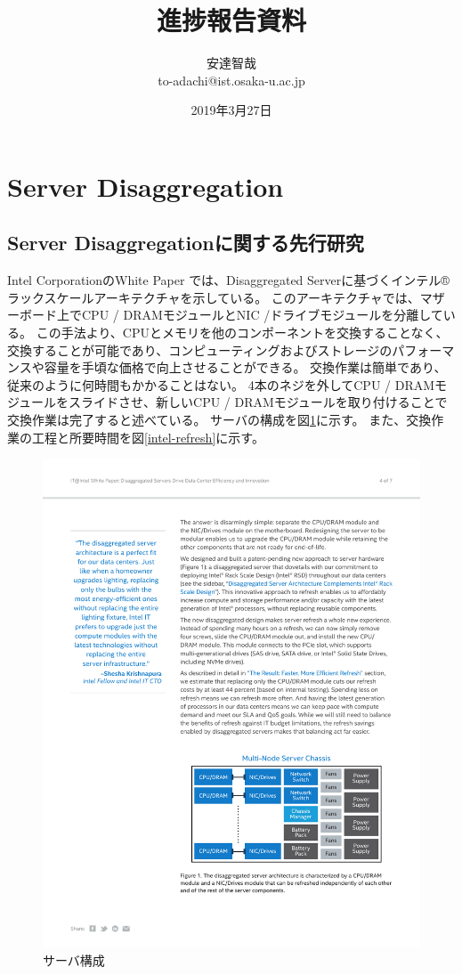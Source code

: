 \documentclass[a4j]{ujarticle}
\title{進捗報告資料}
\author{安達智哉\\to-adachi@ist.osaka-u.ac.jp}
\date{2019年3月27日}
\begin{document}
\maketitle



\section{Server Disaggregation}
\subsection{Server Disaggregationに関する先行研究}
Intel CorporationのWhite Paper \cite{DisaggregatedServersDriveDataCenterEfficiencyandInnovation}では、Disaggregated Serverに基づくインテル®ラックスケールアーキテクチャを示している。
このアーキテクチャでは、マザーボード上でCPU / DRAMモジュールとNIC /ドライブモジュールを分離している。
この手法より、CPUとメモリを他のコンポーネントを交換することなく、交換することが可能であり、コンピューティングおよびストレージのパフォーマンスや容量を手頃な価格で向上させることができる。
交換作業は簡単であり、従来のように何時間もかかることはない。
4本のネジを外してCPU / DRAMモジュールをスライドさせ、新しいCPU / DRAMモジュールを取り付けることで交換作業は完了すると述べている。
サーバの構成を図\ref{intel-server}に示す。
また、交換作業の工程と所要時間を図\ref{intel-refresh}に示す。

\begin{figure}[htbp]
  \centering
  \includegraphics[width=1.0\hsize]{intel-server.pdf}
  \caption{サーバ構成}
  \label{intel-server}
\end{figure}
\end{document}
